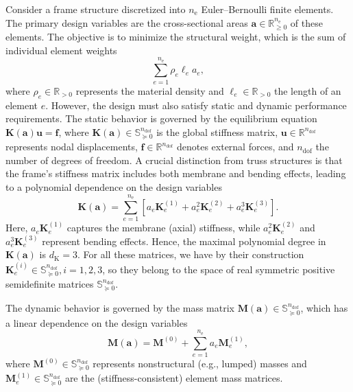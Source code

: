\documentclass[preprint,3p]{elsarticle}
\newcommand{\nel}{n_\mathrm{e}}
\newcommand{\ndof}{n_\mathrm{dof}}
\newcommand{\dK}{d_\mathrm{K}}
\numberwithin{equation}{section}
\begin{document}
Consider a frame structure discretized into $\nel$ Euler--Bernoulli finite elements. The primary design variables are the cross-sectional areas $\mathbf{a} \in \mathbb{R}^{\nel}_{\geq 0}$ of these elements. The objective is to minimize the structural weight, which is the sum of individual element weights
%
\begin{equation}
  \sum_{e=1}^{\nel} \rho_e \ell_e a_e,
\end{equation}
%
where $\rho_e \in \mathbb{R}_{> 0}$ represents the material density and $\ell_e \in \mathbb{R}_{> 0}$ the length of an element $e$. However, the design must also satisfy static and dynamic performance requirements. The static behavior is governed by the equilibrium equation $\mathbf{K}(\mathbf{a})\mathbf{u} = \mathbf{f}$, where $\mathbf{K}(\mathbf{a}) \in \mathbb{S}^{\ndof}_{\succeq 0}$ is the global stiffness matrix, $\mathbf{u} \in \mathbb{R}^{\ndof}$ represents nodal displacements, $\mathbf{f} \in \mathbb{R}^{\ndof}$ denotes external forces, and $\ndof$ the number of degrees of freedom. A crucial distinction from truss structures is that the frame's stiffness matrix includes both membrane and bending effects, leading to a polynomial dependence on the design variables \citep[Appendix A]{Tyburec2024global}
%
\begin{equation}\label{eq:stiffness}
  \mathbf{K}(\mathbf{a}) = \sum_{e=1}^{\nel} \left[a_e \mathbf{K}^{(1)}_{e} + a_e^2 \mathbf{K}^{(2)}_{e} + a_e^3 \mathbf{K}^{(3)}_{e}\right].
\end{equation}
%
Here, $a_e \mathbf{K}^{(1)}_{e}$ captures the membrane (axial) stiffness, while $a_e^2 \mathbf{K}^{(2)}_{e}$ and $a_e^3 \mathbf{K}^{(3)}_{e}$ represent bending effects. Hence, the maximal polynomial degree in $\mathbf{K}(\mathbf{a})$ is $\dK=3$. For all these matrices, we have by their construction $\mathbf{K}_e^{(i)} \in \mathbb{S}^{n_\mathrm{dof}}_{\succeq 0}, i=1,2,3$, so they belong to the space of real symmetric positive semidefinite matrices $\mathbb{S}^{\ndof}_{\succeq0}$.

The dynamic behavior is governed by the mass matrix $\mathbf{M}(\mathbf{a}) \in \mathbb{S}^{\ndof}_{\succeq 0}$, which has a linear dependence on the design variables
%
\begin{equation}\label{eq:mass}
  \mathbf{M}(\mathbf{a}) = \mathbf{M}^{(0)} + \sum_{e=1}^{\nel} a_e \mathbf{M}^{(1)}_{e},
\end{equation}
%
where $\mathbf{M}^{(0)} \in \mathbb{S}^{\ndof}_{\succeq 0}$ represents nonstructural (e.g., lumped) masses and $\mathbf{M}^{(1)}_{e} \in \mathbb{S}^{\ndof}_{\succeq 0}$ are the (stiffness-consistent) element mass matrices.
\end{document}
